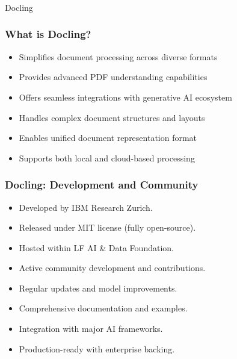 \begin{frame}[fragile]\frametitle{}
\begin{center}
{\Large Docling}
\end{center}

\end{frame}

\begin{frame}[fragile]\frametitle{What is Docling?}
      \begin{itemize}
	\item Simplifies document processing across diverse formats
	\item Provides advanced PDF understanding capabilities
	\item Offers seamless integrations with generative AI ecosystem
	\item Handles complex document structures and layouts
	\item Enables unified document representation format
	\item Supports both local and cloud-based processing
	  \end{itemize}
\end{frame}


\begin{frame}[fragile]\frametitle{Docling: Development and Community}
      \begin{itemize}
        \item Developed by IBM Research Zurich.
        \item Released under MIT license (fully open-source).
        \item Hosted within LF AI \& Data Foundation.
        \item Active community development and contributions.
        \item Regular updates and model improvements.
        \item Comprehensive documentation and examples.
        \item Integration with major AI frameworks.
        \item Production-ready with enterprise backing.
      \end{itemize}
\end{frame}

